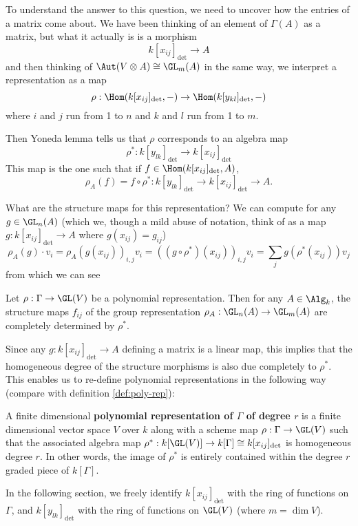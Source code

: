 \documentclass[12pt]{article}
\begin{document}
To understand the answer to this question, we need to uncover how the entries of a matrix come about. We have been thinking of an element of 
$\Gamma(A)$ as a matrix, but what it actually is is a morphism 
\[k[x_{ij}]_{\det}\to A\]
and then thinking of $\Aut(V\otimes A)\cong\GL_m(A)$ in the same way, we interpret a representation 
as a map 
\[\rho:\Hom(k[x_{ij}]_{\det},-)\to \Hom(k[y_{kl}]_{\det},-)\]
where $i$ and $j$ run from 1 to $n$ and $k$ and $l$ run from 1 to $m$. 

Then Yoneda lemma tells us that $\rho$ corresponds to an algebra map
\[\rho^\ast:k[y_{lk}]_{\det}\to k[x_{ij}]_{\det}\]
This map is the one such that if $f\in\Hom(k[x_{ij}]_{\det},A)$,
\[\rho_A(f)=f\circ\rho^\ast:k[y_{lk}]_{\det}\to k[x_{ij}]_{\det}\to A.\]

What are the structure maps for this representation? We can compute for any $g\in \GL_n(A)$ (which we, though a mild
abuse of notation, think of as a map $g:k[x_{ij}]_{\det}\to A$ where $g(x_{ij})=g_{ij}$)
\[\rho_A(g)\cdot v_i=\rho_A(g(x_{ij}))_{i,j}v_i=((g\circ\rho^\ast)(x_{ij}))_{i,j}v_i=\sum_j g(\rho^\ast(x_{ij}))v_j\]
from which we can see
\begin{lem}
	Let $\rho:\Gamma\to \GL(V)$ be a polynomial representation. Then for any $A\in\Alg_k$, the structure maps $f_{ij}$ 
	of the group representation $\rho_A:\GL_n(A)\to \GL_m(A)$ are completely determined by $\rho^\ast$.
\end{lem}

Since any $g:k[x_{ij}]_{\det}\to A$ defining a matrix is a linear map, this implies that the homogeneous degree of 
the structure morphisms is also due completely to $\rho^\ast$. This enables us to re-define polynomial representations 
in the following way (compare with definition \ref{def:poly-rep}):
\begin{defn}\label{def:poly-rep-new}
	A finite dimensional \textbf{polynomial representation of $\Gamma$ of degree $r$} is a finite dimensional vector space $V$ 
	over $k$ along with a scheme map $\rho:\Gamma\to \GL(V)$ such that the associated algebra map $\rho^\ast:k[\GL(V)]\to k[\Gamma]\cong k[x_{ij}]_{\det}$ is homogeneous 
	degree $r$. In other words, the image of $\rho^\ast$ is entirely contained within the degree $r$ graded piece of $k[\Gamma]$.
\end{defn}

\begin{rmk}
	In the following section, we freely identify $k[x_{ij}]_{\det}$ with the ring of functions on $\Gamma$, and $k[y_{lk}]_{\det}$ with 
	the ring of functions on $\GL(V)$ (where $m=\dim V$).
\end{rmk}
\end{document}
